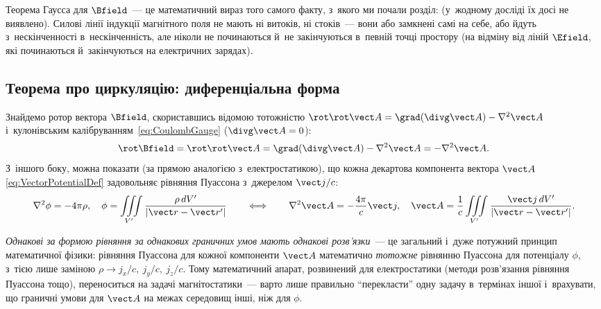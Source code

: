 \begin{Attention}
	Теорема Гаусса для $\Bfield$~--- це математичний вираз того самого факту, з~якого ми
	почали розділ:  (у~жодному досліді їх досі не
	виявлено). Силові лінії індукції магнітного поля не мають ні витоків, ні стоків~---
	вони або замкнені самі на себе, або йдуть з~нескінченності в~нескінченність, але
	ніколи не починаються й~не закінчуються в~певній точці простору (на відміну від ліній
	$\Efield$, які починаються й~закінчуються на електричних зарядах).
\end{Attention}


\subsection*{Теорема про циркуляцію: диференціальна форма}


Знайдемо ротор вектора $\Bfield$, скориставшись відомою тотожністю $\rot\rot\vect A =
	\grad(\divg\vect A) - \nabla^2\vect A$ і~кулонівським
калібруванням~\eqref{eq:CoulombGauge} ($\divg\vect A = 0$):
\begin{equation}\label{eq:CurlBDiff}
	\rot\Bfield = \rot\rot\vect A = \grad(\divg\vect A) - \nabla^2\vect A = -\nabla^2\vect A.
\end{equation}
З~іншого боку, можна показати (за прямою аналогією з~електростатикою), що кожна декартова
компонента вектора $\vect A$ \eqref{eq:VectorPotentialDef} задовольняє рівняння Пуассона
з~джерелом $\vect j/c$:
\begin{equation*}
	\nabla^2\phi = -4\pi\rho, \quad \phi = \iiint\limits_{V'} \frac{\rho\, dV'}{|\vect r-\vect r'|} \qquad\Longleftrightarrow\qquad \nabla^2\vect A
	= -\frac{4\pi}c\vect j, \quad \vect A = \frac1c \iiint\limits_{V'} \frac{\vect j\, dV'}{|\vect r-\vect r'|}.
\end{equation*}

\begin{Attention}
	\emph{Однакові за формою рівняння за однакових граничних умов мають однакові
		розв'язки}~--- це загальний і~дуже потужний принцип математичної фізики: рівняння
	Пуассона для кожної компоненти $\vect A$ математично \emph{тотожне} рівнянню Пуассона
	для потенціалу $\phi$, з~тією лише заміною $\rho \to j_x/c,\ j_y/c,\ j_z/c$. Тому
	математичний апарат, розвинений для електростатики (методи розв'язання рівняння
	Пуассона тощо), переноситься на задачі магнітостатики~--- варто лише правильно
	\enquote{перекласти} одну задачу в~термінах іншої і~врахувати, що граничні умови для
	$\vect A$ на межах середовищ інші, ніж для $\phi$.
\end{Attention}

